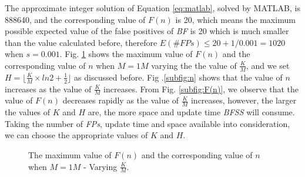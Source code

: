 \documentclass[conference]{IEEEtran}
\begin{document}
The approximate integer solution of Equation \ref{eq:matlab}, solved by MATLAB, is 888640, and the corresponding value of $F(n)$ is 20, which means the maximum possible expected value of the false positives of \emph{BF} is 20 which is much smaller than the value calculated before, therefore $E(\#FPs)\leq 20+1/0.001=1020$ when $s=0.001$. Fig. \ref{fig:n-F(n)} shows the maximum value of $F(n)$ and the corresponding value of $n$ when $M=1M$ varying the the value of $\frac{K}{M}$, and we set $H=\lfloor \frac{K}{M}\times ln2+\frac{1}{2}\rfloor$ as discussed before. Fig .\ref{subfig:n} shows that the value of $n$ increases as the value of $\frac{K}{M}$ increases. From Fig. \ref{subfig:F(n)}, we observe that the value of $F(n)$ decreases rapidly as the value of $\frac{K}{M}$ increases, however, the larger the values of $K$ and $H$ are, the more space and update time \emph{BFSS} will consume. Taking the number of \emph{FPs}, update time and space available into consideration, we can choose the appropriate values of $K$ and $H$.

\begin{figure}[!t]
	\centering
	\begin{minipage}{0.45\linewidth}
		\centering
	\end{minipage}
	\begin{minipage}{0.45\linewidth}
		\centering
	\end{minipage}
	\caption{The maximum value of $F(n)$ and the corresponding value of $n$ when $M=1M$ - Varying $\frac{K}{M}$.}
	\label{fig:n-F(n)}
\end{figure}
\end{document}
